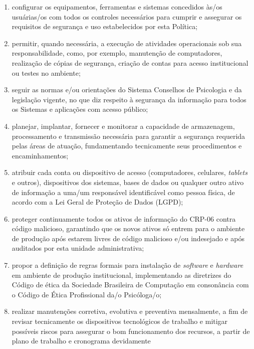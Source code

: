 \begin{enumerate}

\item
    configurar os equipamentos, ferramentas e sistemas concedidos às/os
    usuárias/os com todos os controles necessários para cumprir e
    assegurar os requisitos de segurança e uso estabelecidos por esta
    Política;
\item
    permitir, quando necessária, a execução de atividades operacionais sob
    sua responsabilidade, como, por exemplo, manutenção de computadores,
    realização de cópias de segurança, criação de contas para acesso
    institucional ou testes no ambiente;
\item
    seguir as normas e/ou orientações do Sistema Conselhos de Psicologia e
    da legislação vigente, no que diz respeito à segurança da informação
    para todos os Sistemas e aplicações com acesso público;
\item
    planejar, implantar, fornecer e monitorar a capacidade de armazenagem,
    processamento e transmissão necessária para garantir a segurança
    requerida pelas áreas de atuação, fundamentando tecnicamente seus
    procedimentos e encaminhamentos;
\item
    atribuir cada conta ou dispositivo de acesso (computadores, celulares,
    \emph{tablets} e outros), dispositivos dos sistemas, bases de dados ou
    qualquer outro ativo de informação a uma/um responsável identificável
    como pessoa física, de acordo com a Lei Geral de Proteção de Dados
    (LGPD);
\item
    proteger continuamente todos os ativos de informação do CRP-06 contra
    código malicioso, garantindo que os novos ativos só entrem para o
    ambiente de produção após estarem livres de código malicioso e/ou
    indesejado e após auditados por esta unidade administrativa;
\item
    propor a definição de regras formais para instalação de
    \emph{software} e \emph{hardware} em ambiente de produção
    institucional, implementando as diretrizes do Código de ética da
    Sociedade Brasileira de Computação em consonância com o Código de
    Ética Profissional da/o Psicóloga/o;
\item
    realizar manutenções corretiva, evolutiva e preventiva mensalmente, a
    fim de revisar tecnicamente os dispositivos tecnológicos de trabalho e
    mitigar possíveis riscos para assegurar o bom funcionamento dos
    recursos, a partir de plano de trabalho e cronograma devidamente

\end{enumerate}
